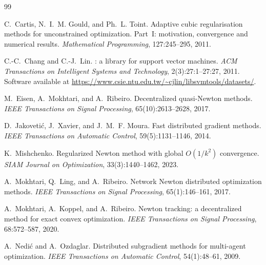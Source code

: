 \documentclass[review,onefignum,onetabnum]{siamart171218}
\begin{document}

	\begin{thebibliography}{99}
		
		C.~Cartis, N.~I.~M. Gould, and Ph.~L. Toint.
		\newblock Adaptive cubic regularisation methods for unconstrained optimization. Part~I: motivation, convergence and numerical results.
		\newblock \emph{Mathematical Programming}, 127:245--295, 2011.
		
		C.-C.~Chang and C.-J.~Lin.
		: a library for support vector machines.
		\newblock \emph{ACM Transactions on Intelligent Systems and Technology}, 2(3):27:1--27:27, 2011.
		\newblock Software available at \url{https://www.csie.ntu.edu.tw/~cjlin/libsvmtools/datasets/}.
		
		M.~Eisen, A.~Mokhtari, and A.~Ribeiro.
		\newblock Decentralized quasi-{N}ewton methods.
		\newblock \emph{IEEE Transactions on Signal Processing}, 65(10):2613--2628, 2017.
		
		D.~Jakoveti{\'c}, J.~Xavier, and J.~M.~F. Moura.
		\newblock Fast distributed gradient methods.
		\newblock \emph{IEEE Transactions on Automatic Control}, 59(5):1131--1146, 2014.
		
		K.~Mishchenko.
		\newblock Regularized {N}ewton method with global $O(1/k^2)$ convergence.
		\newblock \emph{SIAM Journal on Optimization}, 33(3):1440--1462, 2023.
		
		A.~Mokhtari, Q.~Ling, and A.~Ribeiro.
		\newblock Network {N}ewton distributed optimization methods.
		\newblock \emph{IEEE Transactions on Signal Processing}, 65(1):146--161, 2017.
		
		A.~Mokhtari, A.~Koppel, and A.~Ribeiro.
		\newblock Newton tracking: a decentralized method for exact convex optimization.
		\newblock \emph{IEEE Transactions on Signal Processing}, 68:572--587, 2020.
		
		A.~Nedi{\'c} and A.~Ozdaglar.
		\newblock Distributed subgradient methods for multi-agent optimization.
		\newblock \emph{IEEE Transactions on Automatic Control}, 54(1):48--61, 2009.
		

\end{thebibliography}
\end{document}
